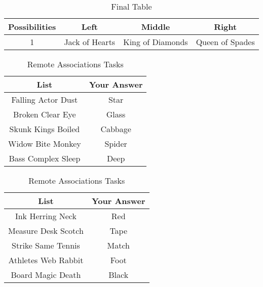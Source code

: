 \documentclass[stu,12pt,floatsintext]{apa7}
\begin{document}
\begin{table}[h!]
	\centering
	\begin{tabular}{cccc}
		\toprule
		\textbf{Possibilities} & \textbf{Left} & \textbf{Middle} & \textbf{Right} \\ \midrule
		1 & Jack of Hearts & King of Diamonds & Queen of Spades \\
		\bottomrule
	\end{tabular}
	\vspace{0.25cm}
	\caption{Final Table}\label{tab:table3}
\end{table}

\begin{table}[h]

\centering
\begin{minipage}{0.45\textwidth}
    \begin{tabular}{cc}
        \toprule
        \textbf{List} & \textbf{Your Answer} \\
        \midrule
        Falling Actor Dust & Star \\
        \midrule
        Broken Clear Eye & Glass \\
        \midrule
        Skunk Kings Boiled & Cabbage \\        
		\midrule
        Widow Bite Monkey & Spider \\
        \midrule
        Bass Complex Sleep & Deep \\
        \bottomrule
    \end{tabular}
\end{minipage}
\hfill
\begin{minipage}{0.45\textwidth}
    \begin{tabular}{cc}
        \toprule
        \textbf{List} & \textbf{Your Answer} \\
        \midrule
        Ink Herring Neck & Red \\
        \midrule
        Measure Desk Scotch & Tape \\
        \midrule
		Strike Same Tennis & Match \\        
		\midrule
        Athletes Web Rabbit & Foot \\        
		\midrule
        Board Magic Death & Black \\
        \bottomrule
    \end{tabular}
\end{minipage}
\vspace{0.25cm}
\caption{Remote Associations Tasks}\label{tab:table4}
\end{table}
\end{document}
